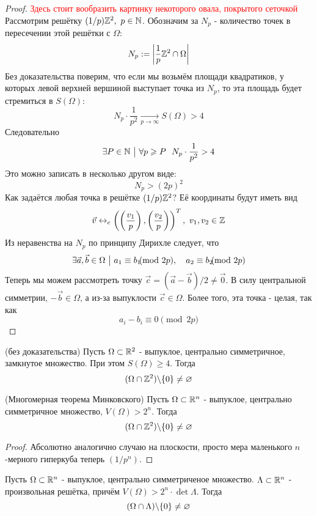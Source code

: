 \begin{proof}
	\textcolor{red}{Здесь стоит вообразить картинку некоторого овала, покрытого сеточкой}
	Рассмотрим решётку $(1/p)\mathbb{Z}^2,\ p \in \mathbb{N}$. Обозначим за $N_p$ - количество точек в пересечении этой решётки с $\Omega$:
	\[
		N_p := \left|\frac{1}{p}\mathbb{Z}^2 \cap \Omega\right|
	\]
	Без доказательства поверим, что если мы возьмём площади квадратиков, у которых левой верхней вершиной выступает точка из $N_p$, то эта площадь будет стремиться в $S(\Omega)$:
	\[
		N_p \cdot \frac{1}{p^2} \xrightarrow[p \to \infty]{} S(\Omega) > 4
	\]
	Следовательно
	\[
		\exists P \in \mathbb{N} \ \big|\  \forall p \geqslant P\ \ N_p \cdot \frac{1}{p^2} > 4
	\]
	Это можно записать в несколько другом виде:
	\[
		N_p > (2p)^2
	\]
	Как задаётся любая точка в решётке $(1/p)\mathbb{Z}^2$? Её координаты будут иметь вид
	\[
		\vec{v} \leftrightarrow_e \left(\left(\frac{v_1}{p}\right), \left(\frac{v_2}{p}\right)\right)^T,\ v_1, v_2 \in \Z
	\]
	Из неравенства на $N_p$ по принципу Дирихле следует, что
	\[
		\exists \vec{a}, \vec{b} \in \Omega \such a_1 \equiv b_1\!\!\!\! \pmod {2p},\quad a_2 \equiv b_2\!\!\!\! \pmod {2p}
	\]
	Теперь мы можем рассмотреть точку $\vec{c} = (\vec{a} - \vec{b}) / 2 \neq \vec{0}$. В силу центральной симметрии, $-\vec{b} \in \Omega$, а из-за выпуклости $\vec{c} \in \Omega$. Более того, эта точка - целая, так как
	\[
		a_i - b_i \equiv 0 \pmod {2p}
	\]
\end{proof}

\begin{theorem} (без доказательства)
	Пусть $\Omega \subset \mathbb{R}^2$ - выпуклое, центрально симметричное, замкнутое множество. При этом $S(\Omega) \ge 4$. Тогда
	\[
		(\Omega \cap \mathbb{Z}^2) \backslash \{0\} \neq \varnothing
	\]
\end{theorem}

\begin{theorem} (Многомерная теорема Минковского)
	Пусть $\Omega \subset \mathbb{R}^n$ - выпуклое, центрально симметричное множество, $V(\Omega) > 2^n$. Тогда
	\[
		(\Omega \cap \mathbb{Z}^2) \backslash \{0\} \neq \varnothing
	\]
\end{theorem}

\begin{proof}
	Абсолютно аналогично случаю на плоскости, просто мера маленького $n$-мерного гиперкуба теперь $(1/p^n)$.
\end{proof}

\begin{theorem}
	Пусть $\Omega \subset \mathbb{R}^n$ - выпуклое, центрально симметриченое множество. $\Lambda \subset \mathbb{R}^n$ - произвольная решётка, причём $V(\Omega) > 2^n \cdot \det \Lambda$. Тогда
	\[
		(\Omega \cap \Lambda) \backslash \{0\} \neq \varnothing
	\]
\end{theorem}

